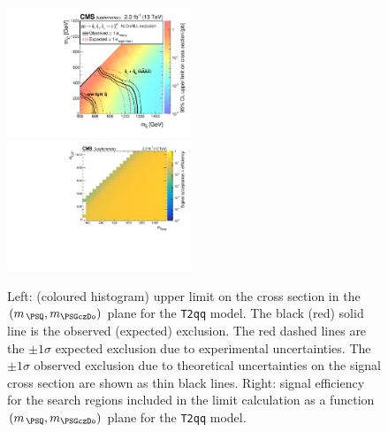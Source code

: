 \clearpage
\begin{figure}[t]
  \begin{center}
    \includegraphics[width=0.49\textwidth]{RA1T2qqXSEC_aux} \, 
    \includegraphics[width=0.49\textwidth]{T2qq_merging_4_cats_aux} \,     
  \end{center}
  \caption{Left: (coloured histogram) upper limit on the cross section in the $(m_{\,\PSQ}, m_{\PSGczDo})$ plane for the \texttt{T2qq} model. 
  The black (red) solid line is the observed (expected) exclusion. The red dashed lines are the $\pm1\sigma$ expected exclusion due to experimental uncertainties. 
  The $\pm1\sigma$ observed exclusion due to theoretical uncertainties on the signal cross section are shown as thin black lines. 
  Right: signal efficiency for the search regions included in the limit calculation as a function $(m_{\,\PSQ}, m_{\PSGczDo})$ plane for the \texttt{T2qq} model. 
  \label{fig:T2qq_excl}}
\end{figure}





